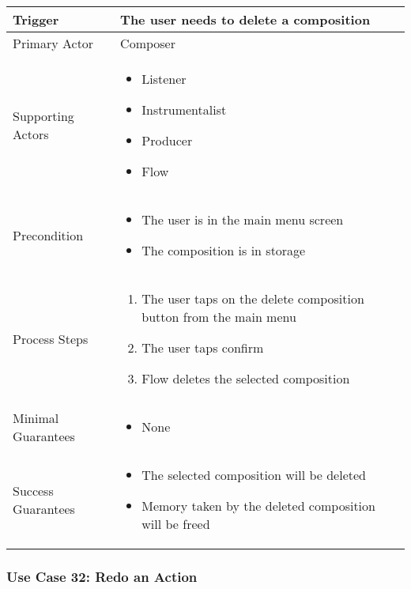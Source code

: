   \begin{tabularx}{\textwidth}{|X|X|}
  \hline
  Trigger & 
  The user needs to delete a composition \\
  \hline
  Primary Actor & 
  Composer \\
  \hline
  Supporting Actors & 
  \begin{itemize}
  \item Listener
  \item Instrumentalist
  \item Producer
  \item Flow
  \end{itemize} \\
  \hline
  Precondition & 
  \begin{itemize}
  \item The user is in the main menu screen
  \item The composition is in storage
  \end{itemize} \\
  \hline
  Process Steps & 
  \begin{enumerate}
  \item The user taps on the delete composition button from the main menu
  \item The user taps confirm
  \item Flow deletes the selected composition
  \end{enumerate} \\
  \hline
  Minimal Guarantees & 
  \begin{itemize}
    \item None
  \end{itemize} \\
  \hline
  Success Guarantees & 
  \begin{itemize}
    \item The selected composition will be deleted
    \item Memory taken by the deleted composition will be freed
  \end{itemize} \\
  \hline
  \end{tabularx}

  \subsubsection{Use Case 32: Redo an Action}

